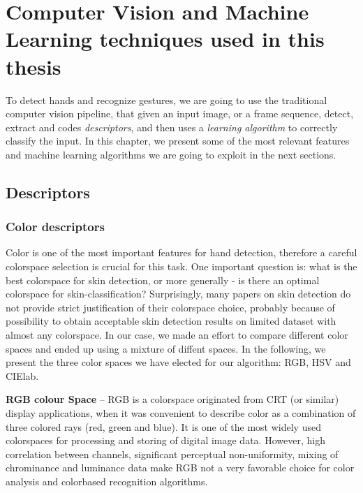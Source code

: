 
\chapter{Computer Vision and Machine Learning techniques used in this thesis}
\label{chpt2}

To detect hands and recognize gestures, we are going to use the traditional computer vision pipeline, that given an input image, or a frame sequence, detect, extract and codes \textit{descriptors}, and then uses a \textit{learning algorithm} to correctly classify the input. In this chapter, we present some of the most relevant features and machine learning algorithms we are going to exploit in the next sections.

\section{Descriptors}
\subsection{Color descriptors}
Color is one of the most important features for hand detection, therefore a careful colorspace selection is crucial for this task. One important question is: what is the best
colorspace for skin detection, or more generally - is there an optimal colorspace for skin-classification? Surprisingly, many papers on
skin detection do not provide strict justification of their colorspace choice, probably because of possibility to obtain acceptable skin
detection results on limited dataset with almost any colorspace. In our case, we made an effort to compare different color spaces and ended up using a mixture of diffent spaces. In the following, we present the three color spaces we have elected for our algorithm: RGB, HSV and CIElab.

\textbf{RGB colour Space} --  RGB is a colorspace originated from CRT (or similar) display applications, when it was convenient to describe color as a combination of three colored rays (red, green and blue). It is one of the most widely used colorspaces for processing and storing of digital image data. However, high correlation between channels, significant perceptual non-uniformity, mixing of chrominance and luminance data make RGB not a very favorable choice for color analysis and colorbased recognition algorithms.


